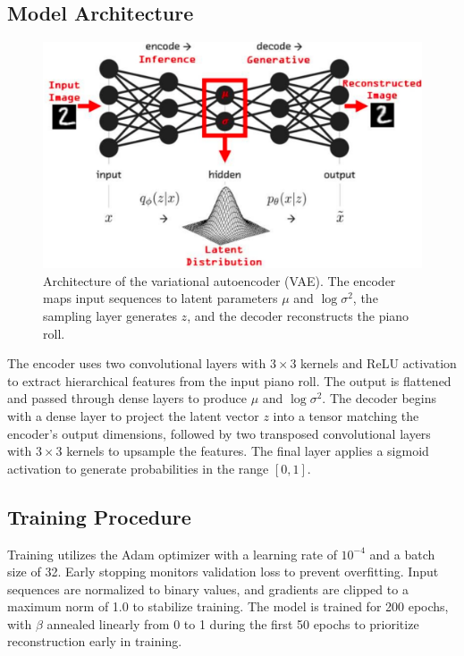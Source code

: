 \documentclass[conference]{IEEEtran}
\begin{document}
\subsection{Model Architecture}
\begin{figure}[h]
    \centering
    \includegraphics[width=\linewidth]{vae_architecture.png}
    \caption{Architecture of the variational autoencoder (VAE). The encoder maps input sequences to latent parameters $\mu$ and $\log\sigma^2$, the sampling layer generates $z$, and the decoder reconstructs the piano roll.}
    \label{fig:vae_arch}
\end{figure}

The encoder uses two convolutional layers with $3 \times 3$ kernels and ReLU activation to extract hierarchical features from the input piano roll. The output is flattened and passed through dense layers to produce $\mu$ and $\log\sigma^2$. The decoder begins with a dense layer to project the latent vector $z$ into a tensor matching the encoder's output dimensions, followed by two transposed convolutional layers with $3 \times 3$ kernels to upsample the features. The final layer applies a sigmoid activation to generate probabilities in the range $[0, 1]$.


\subsection{Training Procedure}
Training utilizes the Adam optimizer with a learning rate of $10^{-4}$ and a batch size of 32. Early stopping monitors validation loss to prevent overfitting. Input sequences are normalized to binary values, and gradients are clipped to a maximum norm of 1.0 to stabilize training. The model is trained for 200 epochs, with $\beta$ annealed linearly from 0 to 1 during the first 50 epochs to prioritize reconstruction early in training.
\end{document}
